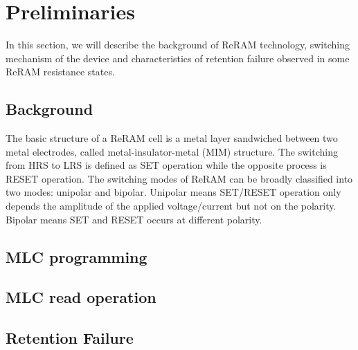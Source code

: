 \section{Preliminaries} \label{sec:preliminary}

In this section, we will describe the background of ReRAM technology, switching mechanism of the device and characteristics of retention failure observed in some ReRAM resistance states.

\subsection{Background}
The basic structure of a ReRAM cell is a metal layer sandwiched between two metal electrodes, called metal-insulator-metal (MIM) structure. The switching from HRS to LRS is defined as SET operation while the opposite process is RESET operation. The switching modes of ReRAM can be broadly classified into two modes: unipolar and bipolar. Unipolar means SET/RESET operation only depends the amplitude of the applied voltage/current but not on the polarity. Bipolar means SET and RESET occurs at different polarity. 
\subsection{MLC programming}

\subsection{MLC read operation}

\subsection{Retention Failure}

